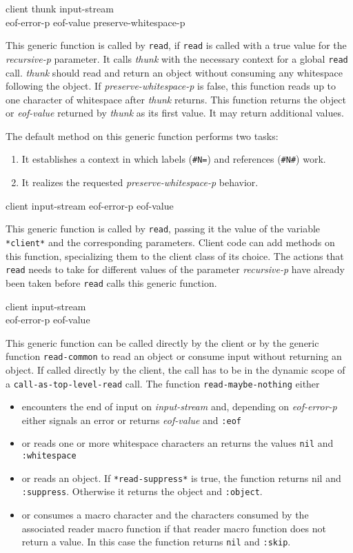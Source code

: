  {client thunk input-stream\\
  eof-error-p eof-value preserve-whitespace-p}

This generic function is called by \texttt{read}, if \texttt{read} is
called with a true value for the \textit{recursive-p} parameter.  It
calls \textit{thunk} with the necessary context for a global
\texttt{read} call.  \textit{thunk} should read and return an object
without consuming any whitespace following the object.  If
\textit{preserve-whitespace-p} is false, this function reads up to one
character of whitespace after \textit{thunk} returns.  This function
returns the object or \textit{eof-value} returned by \textit{thunk} as
its first value.  It may return additional values.

The default method on this generic function performs two tasks:
\begin{enumerate}
\item It establishes a context in which labels (\texttt{\#N=}) and
  references (\texttt{\#N\#}) work.
\item It realizes the requested \textit{preserve-whitespace-p}
  behavior.
\end{enumerate}

 {client input-stream eof-error-p eof-value}

This generic function is called by \texttt{read}, passing it the value
of the variable \texttt{*client*} and the corresponding parameters.
Client code can add methods on this function, specializing them to the
client class of its choice.  The actions that \texttt{read} needs to
take for different values of the parameter \textit{recursive-p} have
already been taken before \texttt{read} calls this generic function.

 {client input-stream\\
  eof-error-p eof-value}

This generic function can be called directly by the client or by the
generic function \texttt{read-common} to read an object or consume
input without returning an object.  If called directly by the client,
the call has to be in the dynamic scope of a
\texttt{call-as-top-level-read} call.  The function
\texttt{read-maybe-nothing} either
\begin{itemize}
\item encounters the end of input on \textit{input-stream} and,
  depending on \textit{eof-error-p} either signals an error or returns
  \textit{eof-value} and \texttt{:eof}
\item or reads one or more whitespace characters an returns the values
  \texttt{nil} and \texttt{:whitespace}
\item or reads an object.  If \texttt{*read-suppress*} is true, the
  function returns nil and \texttt{:suppress}.  Otherwise it returns
  the object and \texttt{:object}.
\item or consumes a macro character and the characters consumed by the
  associated reader macro function if that reader macro function does
  not return a value.  In this case the function returns \texttt{nil}
  and \texttt{:skip}.
\end{itemize}

